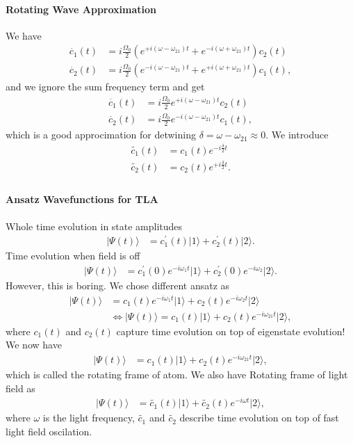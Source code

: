 \documentclass[../../note.tex]{subfiles}
\begin{document}
\paragraph{Rotating Wave Approximation}
We have
\begin{align}
    \dot{c_1}(t)
    &= i \frac{\Omega_0}{2}  (e^{+ i (\omega - \omega_{21}) t} + e^{-i (\omega + \omega_{21}) t})c_2(t) \\
    \dot{c_2}(t)
    &= i \frac{\Omega_0}{2}  (e^{- i (\omega - \omega_{21}) t} + e^{+i (\omega + \omega_{21}) t}) c_1(t),
\end{align}
and we ignore the sum frequency term and get
\begin{align}
    \dot{c_1}(t)
    &= i \frac{\Omega_0}{2}  e^{+ i (\omega - \omega_{21}) t} c_2(t) \\
    \dot{c_2}(t)
    &= i \frac{\Omega_0}{2}  e^{- i (\omega - \omega_{21}) t}  c_1(t),
\end{align}
which is a good approcimation for detwining $\delta = \omega - \omega_{21} \approx 0$.
We introduce
\begin{align}
    \tilde{c_1}(t)
    &= c_1(t) e^{-i \frac{\delta}{2} t} \\
    \tilde{c_2}(t)
    &= c_2(t) e^{+i \frac{\delta}{2} t}. \\
\end{align}
\paragraph{Ansatz Wavefunctions for TLA}
Whole time evolution in state amplitudes
\begin{align}
    \vert \Psi(t) \rangle 
    &= c_1^\prime(t) \vert 1 \rangle + c_2^\prime(t) \vert 2 \rangle.
\end{align}
Time evolution when field is off
\begin{align}
    \vert \Psi(t) \rangle 
    &= c_1^\prime(0) e^{-i \omega_1 t} \vert 1 \rangle + c_2^\prime(0) e^{-i \omega_2} \vert 2 \rangle.
\end{align}
However, this is boring. We chose different ansatz as
\begin{align}
    \vert \Psi(t) \rangle
    &= c_1(t) e^{-i\omega_1 t} \vert 1 \rangle + c_2(t) e^{-i\omega_2 t} \vert 2 \rangle \\
    &\Longleftrightarrow \vert \Psi(t) \rangle
    = c_1(t)  \vert 1 \rangle + c_2(t) e^{-i\omega_{21} t} \vert 2 \rangle, 
\end{align}
where $c_1(t)$ and $c_2(t)$ capture time evolution on top of eigenstate evolution! We now have
\begin{align}
    \vert \Psi(t) \rangle
    &= c_1(t)  \vert 1 \rangle + c_2(t) e^{-i\omega_{21} t} \vert 2 \rangle,
\end{align}
which is called the rotating frame of atom. We also have Rotating frame of light field as
\begin{align}
    \vert \Psi(t) \rangle
    &= \tilde{c_1}(t)  \vert 1 \rangle + \tilde{c_2}(t) e^{-i\omega t} \vert 2 \rangle,
\end{align}
where $\omega$ is the light frequency, $\tilde{c_1}$ and $\tilde{c_2}$ describe time evolution on top of fast light field oscilation.
\end{document}
